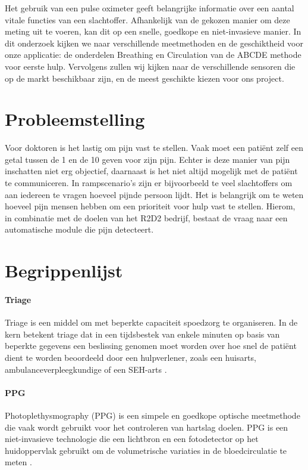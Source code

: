 \documentclass[11pt]{article}
\begin{document}
    Het gebruik van een pulse oximeter geeft belangrijke informatie over een aantal vitale functies van een slachtoffer. 
    Afhankelijk van de gekozen manier om deze meting uit te voeren, kan dit op een snelle, goedkope en niet-invasieve manier.
    In dit onderzoek kijken we naar verschillende meetmethoden en de geschiktheid voor onze applicatie: de onderdelen Breathing en Circulation van de ABCDE methode voor eerste hulp.
    Vervolgens zullen wij kijken naar de verschillende sensoren die op de markt beschikbaar zijn, en de meest geschikte kiezen voor ons project.


    \section{Probleemstelling}\label{sec:probleemstelling}
    Voor doktoren is het lastig om pijn vast te stellen.
    Vaak moet een pati\"{e}nt zelf een getal tussen de 1 en de 10 geven voor zijn pijn.
    Echter is deze manier van pijn inschatten niet erg objectief, daarnaast is het niet
    altijd mogelijk met de pati\"{e}nt te communiceren.
    In rampscenario's zijn er bijvoorbeeld te veel slachtoffers om aan iedereen te vragen hoeveel pijnde persoon lijdt.
    Het is belangrijk om te weten hoeveel pijn mensen hebben om een prioriteit voor hulp vast te stellen.
    Hierom, in combinatie met de doelen van het R2D2 bedrijf, bestaat de vraag naar een automatische module die pijn
    detecteert.

    \section{Begrippenlijst}\label{sec:begrippenlijst}
    \paragraph{Triage}
    Triage is een middel om met beperkte capaciteit spoedzorg te organiseren. 
    In de kern betekent triage dat in een tijdsbestek van enkele minuten op basis van beperkte gegevens een beslissing genomen moet worden over hoe snel de patiënt dient te worden beoordeeld door een hulpverlener, zoals een huisarts, ambulanceverpleegkundige of een SEH-arts \citep{ntstriage}.    

    \paragraph{PPG} 
    Photoplethysmography (PPG) is een simpele en goedkope optische meetmethode die vaak wordt gebruikt voor het controleren van hartslag doelen. 
    PPG is een niet-invasieve technologie die een lichtbron en een fotodetector op het huidoppervlak gebruikt om de volumetrische variaties in de bloedcirculatie te meten \citep{castaneda2018review}. 
\end{document}
